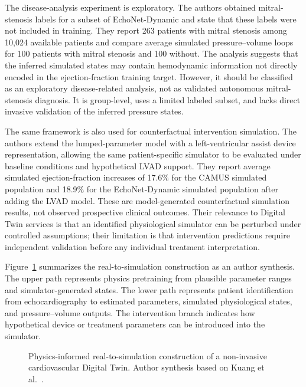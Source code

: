 The disease-analysis experiment is exploratory. The authors obtained mitral-stenosis labels for a subset of EchoNet-Dynamic and state that these labels were not included in training. They report 263 patients with mitral stenosis among 10,024 available patients and compare average simulated pressure--volume loops for 100 patients with mitral stenosis and 100 without. The analysis suggests that the inferred simulated states may contain hemodynamic information not directly encoded in the ejection-fraction training target. However, it should be classified as an exploratory disease-related analysis, not as validated autonomous mitral-stenosis diagnosis. It is group-level, uses a limited labeled subset, and lacks direct invasive validation of the inferred pressure states.

The same framework is also used for counterfactual intervention simulation. The authors extend the lumped-parameter model with a left-ventricular assist device representation, allowing the same patient-specific simulator to be evaluated under baseline conditions and hypothetical LVAD support. They report average simulated ejection-fraction increases of 17.6\% for the CAMUS simulated population and 18.9\% for the EchoNet-Dynamic simulated population after adding the LVAD model. These are model-generated counterfactual simulation results, not observed prospective clinical outcomes. Their relevance to Digital Twin services is that an identified physiological simulator can be perturbed under controlled assumptions; their limitation is that intervention predictions require independent validation before any individual treatment interpretation.

Figure~\ref{fig:med_real2sim_pipeline} summarizes the real-to-simulation construction as an author synthesis. The upper path represents physics pretraining from plausible parameter ranges and simulator-generated states. The lower path represents patient identification from echocardiography to estimated parameters, simulated physiological states, and pressure--volume outputs. The intervention branch indicates how hypothetical device or treatment parameters can be introduced into the simulator.

\begin{figure}[H]
    \centering
    \resizebox{0.98\textwidth}{!}{}
    \caption{Physics-informed real-to-simulation construction of a non-invasive cardiovascular Digital Twin. Author synthesis based on Kuang et al.~\cite{kuang2024medreal2sim}.}
    \label{fig:med_real2sim_pipeline}
\end{figure}

